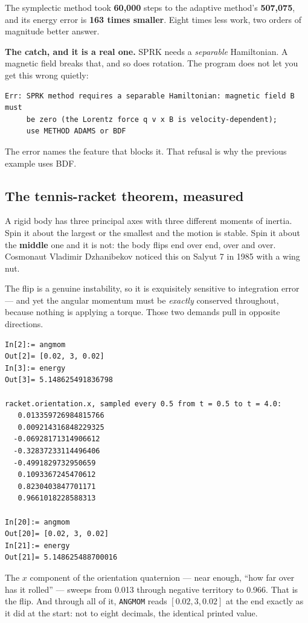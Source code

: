 \documentclass[11pt]{article}
\newcommand{\kw}[1]{\texttt{\uppercase{#1}}}
\begin{document}
The symplectic method took \textbf{60{,}000} steps to the adaptive
method's \textbf{507{,}075}, and its energy error is \textbf{163 times
smaller}. Eight times less work, two orders of magnitude better answer.

\textbf{The catch, and it is a real one.} SPRK needs a \emph{separable}
Hamiltonian. A magnetic field breaks that, and so does rotation. The
program does not let you get this wrong quietly:

\begin{lstlisting}
Err: SPRK method requires a separable Hamiltonian: magnetic field B must
     be zero (the Lorentz force q v x B is velocity-dependent);
     use METHOD ADAMS or BDF
\end{lstlisting}

The error names the feature that blocks it. That refusal is why the
previous example uses BDF.

\subsection{The tennis-racket theorem, measured}

A rigid body has three principal axes with three different moments of
inertia. Spin it about the largest or the smallest and the motion is
stable. Spin it about the \textbf{middle} one and it is not: the body
flips end over end, over and over. Cosmonaut Vladimir Dzhanibekov
noticed this on Salyut 7 in 1985 with a wing nut.

The flip is a genuine instability, so it is exquisitely sensitive to
integration error --- and yet the angular momentum must be
\emph{exactly} conserved throughout, because nothing is applying a
torque. Those two demands pull in opposite directions.

\begin{lstlisting}
In[2]:= angmom
Out[2]= [0.02, 3, 0.02]
In[3]:= energy
Out[3]= 5.148625491836798

racket.orientation.x, sampled every 0.5 from t = 0.5 to t = 4.0:
   0.013359726984815766
   0.009214316848229325
  -0.06928171314906612
  -0.32837233114496406
  -0.4991829732950659
   0.1093367245470612
   0.8230403847701171
   0.9661018228588313

In[20]:= angmom
Out[20]= [0.02, 3, 0.02]
In[21]:= energy
Out[21]= 5.148625488700016
\end{lstlisting}

The $x$ component of the orientation quaternion --- near enough, ``how
far over has it rolled'' --- sweeps from 0.013 through negative
territory to 0.966. That is the flip. And through all of it,
\kw{angmom} reads $[0.02, 3, 0.02]$ at the end exactly as it did at the
start: not to eight decimals, the identical printed value.
\end{document}
